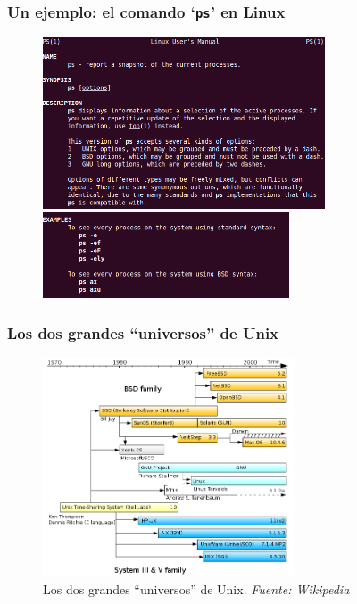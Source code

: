 \documentclass{beamer}
\begin{document}
\begin{frame}
\frametitle{Un ejemplo: el comando `\texttt{ps}' en Linux}

\begin{figure}[h]

\begin{center}
  \includegraphics[height=2.0in]{figs/ps.png} \\
  \includegraphics[height=1.0in]{figs/ps-2.png}
\end{center}
\end{figure}


\end{frame}



\begin{frame}
\frametitle{Los dos grandes ``universos'' de Unix}


\begin{figure}[h]

\begin{center}
  \includegraphics[height=2.55in]{figs/Unix_history.png}
  \caption{{\footnotesize Los dos grandes ``universos'' de Unix. \textit{Fuente: Wikipedia}}}
\end{center}
\end{figure}


\end{frame}
\end{document}
